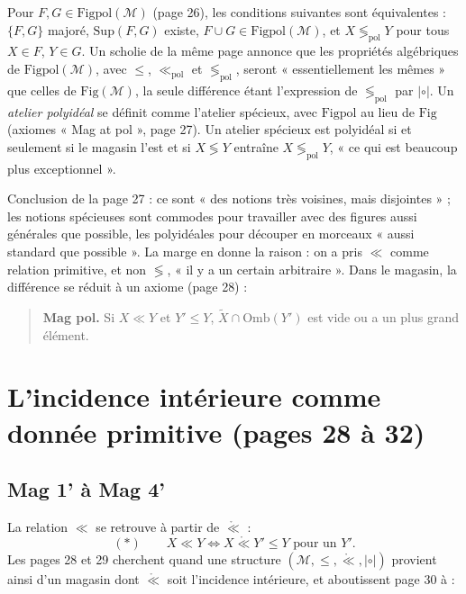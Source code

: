 \documentclass[11pt,a4paper]{article}
\begin{document}
Pour $F, G \in \mathrm{Figpol}(\mathcal{M})$ (page 26), les conditions
suivantes sont équivalentes : $\{F,G\}$ majoré, $\mathrm{Sup}(F,G)$ existe,
$F \cup G \in \mathrm{Figpol}(\mathcal{M})$, et $X \lessgtr_{\mathrm{pol}} Y$
pour tous $X \in F$, $Y \in G$. Un scholie de la même page annonce que
les propriétés algébriques de $\mathrm{Figpol}(\mathcal{M})$, avec $\leq$,
$\ll_{\mathrm{pol}}$ et $\lessgtr_{\mathrm{pol}}$, seront « essentiellement les
mêmes » que celles de $\mathrm{Fig}(\mathcal{M})$, la seule différence étant
l'expression de $\lessgtr_{\mathrm{pol}}$ par $\mathrel{|\circ|}$. Un \emph{atelier polyidéal} se définit comme
l'atelier spécieux, avec $\mathrm{Figpol}$ au lieu de $\mathrm{Fig}$ (axiomes
« Mag at pol », page 27). Un atelier spécieux est polyidéal si et seulement si
le magasin l'est et si $X \lessgtr Y$ entraîne $X \lessgtr_{\mathrm{pol}} Y$,
« ce qui est beaucoup plus exceptionnel ».

Conclusion de la page 27 : ce sont « des notions très voisines, mais
disjointes » ; les notions spécieuses sont commodes pour travailler avec des
figures aussi générales que possible, les polyidéales pour découper en
morceaux « aussi standard que possible ». La marge en donne la raison : on a
pris $\ll$ comme relation primitive, et non $\lessgtr$, « il y a un certain
arbitraire ». Dans le magasin, la différence se réduit à un axiome (page 28) :
\begin{quote}
\textbf{Mag pol.} Si $X \ll Y$ et $Y' \leq Y$, $\widetilde{X} \cap
\mathrm{Omb}(Y')$ est vide ou a un plus grand élément.
\end{quote}

\section*{L'incidence intérieure comme donnée primitive (pages 28 à 32)}

\subsection*{Mag 1' à Mag 4'}

La relation $\ll$ se retrouve à partir de $\mathring{\ll}$ :
\[
(*) \qquad X \ll Y \iff X \mathrel{\mathring{\ll}} Y' \leq Y \text{ pour un }
Y'.
\]
Les pages 28 et 29 cherchent quand une structure $(\mathcal{M}, \leq,
\mathring{\ll}, \mathrel{|\circ|})$ provient ainsi d'un magasin dont
$\mathring{\ll}$ soit l'incidence intérieure, et aboutissent page 30 à :
\end{document}
